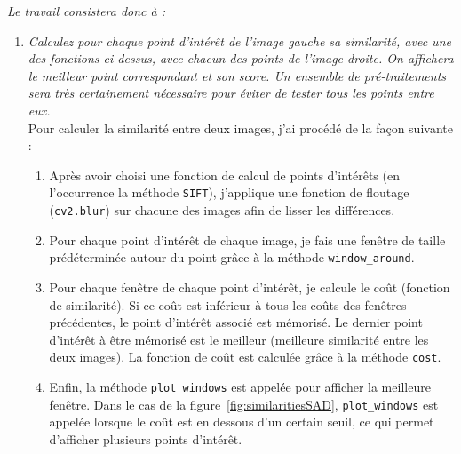 \documentclass{article}
\begin{document}
\begin{enumerate}
    \textit{Le travail consistera donc à :}
    
    \begin{enumerate}
        \item  \textit{Calculez pour chaque point d’intérêt de l’image gauche sa similarité, avec une des fonctions ci-dessus, avec chacun des points de l’image droite. On affichera le meilleur point correspondant et son score. Un ensemble de pré-traitements sera très certainement nécessaire pour éviter de tester tous les points entre eux.}
        \\
        
        Pour calculer la similarité entre deux images, j'ai procédé de la façon suivante : \\
        
        \begin{enumerate}
            \item Après avoir choisi une fonction de calcul de points d'intérêts (en l'occurrence la méthode \verb+SIFT+), j'applique une fonction de floutage (\verb+cv2.blur+) sur chacune des images afin de lisser les différences.\\
        
            \item Pour chaque point d'intérêt de chaque image, je fais une fenêtre de taille prédéterminée autour du point grâce à la méthode \verb+window_around+.\\
            
            \item Pour chaque fenêtre de chaque point d'intérêt, je calcule le coût (fonction de similarité). Si ce coût est inférieur à tous les coûts des fenêtres précédentes, le point d'intérêt associé est mémorisé. Le dernier point d'intérêt à être mémorisé est le meilleur (meilleure similarité entre les deux images). La fonction de coût est calculée grâce à la méthode \verb+cost+.
            
            \item Enfin, la méthode \verb+plot_windows+ est appelée pour afficher la meilleure fenêtre. Dans le cas de la figure~\ref{fig:similaritiesSAD},  \verb+plot_windows+ est appelée lorsque le coût est en dessous d'un certain seuil, ce qui permet d'afficher plusieurs points d'intérêt.
            \\\\
            

            


\end{enumerate}
\end{enumerate}
\end{enumerate}
\end{document}
